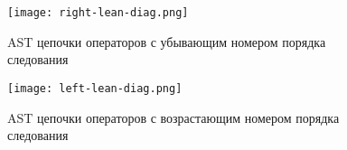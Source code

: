 \begin{figure}[h!]
    \texttt{[image: right-lean-diag.png]}
    \centering
    \caption{AST цепочки операторов с убывающим номером порядка следования}
    \label{pratt:right-lean-diag}
\end{figure}
\begin{figure}[h!]
    \texttt{[image: left-lean-diag.png]}
    \centering
    \caption{AST цепочки операторов с возрастающим номером порядка следования}
    \label{pratt:left-lean-diag}
\end{figure}

\FloatBarrier










